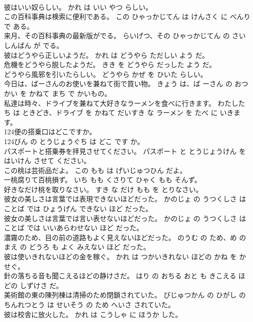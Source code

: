 \documentclass[8pt]{extreport}
\begin{document}
\begin{CJK}{UTF8}{min}
\\	彼はいい奴らしい。	かれ は いい やつ らしい。	
\\	この百科事典は検索に便利である。	この ひゃっかじてん は けんさく に べんり で ある。	
\\	来月、その百科事典の最新版がでる。	らいげつ、その ひゃっかじてん の さいしんばん が でる。	
\\	彼はどうやら正しいようだ。	かれ は どうやら ただしい よう だ。	
\\	危機をどうやら脱したようだ。	きき を どうやら だっした よう だ。	
\\	どうやら風邪を引いたらしい。	どうやら かぜ を ひいた らしい。	
\\	今日は、ばーさんのお使いを兼ねて街で買い物。	きょう は、ば ーさん の おつかい を かねて まち で かいもの。	
\\	私達は時々、ドライブを兼ねて大好きなラーメンを食べに行きます。	わたしたち は ときどき、ドライブ を かねて だいすき な ラーメン を たべ に いきます。	
\\	124便の搭乗口はどこですか。	
\\	124びん の とうじょうぐち は どこ です か。	
\\	パスポートと搭乗券を拝見させてください。	パスポート と とうじょうけん を はいけん させて ください。	
\\	この桃は芸術品だよ。	この もも は げいじゅつひん だよ。	
\\	一桃腐りて百桃損ず。	いち もも くさりて ひゃく もも そんず。	
\\	好きなだけ桃を取りなさい。	すき な だけ もも を とりなさい。	
\\	彼女の美しさは言葉では表現できないほどだった。	かのじょ の うつくしさ は ことば では ひょうげん できない ほど だった。	
\\	彼女の美しさは言葉では言い表せないほどだった。	かのじょ の うつくしさ は ことば では いいあらわせない ほど だった。	
\\	濃霧のため、目の前の道路もよく見えないほどだった。	のうむ の ため、め の まえ の どうろ も よく みえない ほど だった。	
\\	彼は使いきれないほどの金を稼ぐ。	かれ は つかいきれない ほどの かね を かせぐ。	
\\	針の落ちる音も聞こえるほどの静けさだ。	はり の おちる おと も きこえる ほどの しずけさ だ。	
\\	美術館の東の陳列棟は清掃のため閉鎖されていた。	びじゅつかん の ひがし の ちんれつとう は せいそう の ため へいさ されていた。	
\\	彼は校舎に放火した。	かれ は こうしゃ に ほうか した。	

\end{CJK}
\end{document}

